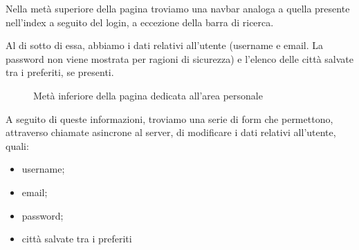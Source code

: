 Nella metà superiore della pagina troviamo una navbar analoga a quella presente nell'index a seguito del login, a eccezione della barra di ricerca.

\vspace{5mm}

Al di sotto di essa, abbiamo i dati relativi all'utente (username e email. La password non viene mostrata per ragioni di
sicurezza) e l'elenco delle città salvate tra i preferiti, se presenti.

\newpage
\begin{figure}[ht]
    \centering
    \caption{Metà inferiore della pagina dedicata all'area personale}
\end{figure}

A seguito di queste informazioni, troviamo una serie di form che permettono, attraverso chiamate asincrone al server, di modificare
i dati relativi all'utente, quali:
\begin{itemize}
    \item username;
    \item email;
    \item password;
    \item città salvate tra i preferiti
\end{itemize}